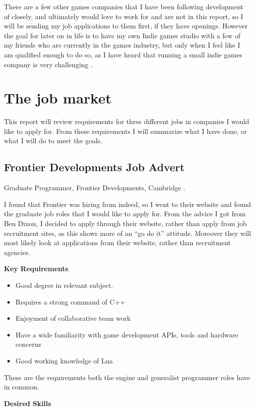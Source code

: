 \documentclass{scrartcl}
\begin{document}
There are a few other games companies that I have been following development of closely, and ultimately would love to work for and are not in this report, so I will be sending my job applications to them first, if they have openings.
However the goal for later on in life is to have my own Indie games studio with a few of my friends who are currently in the games industry, but only when I feel like I am qualified enough to do so, as I have heard that running a small indie games company is very challenging \cite{indieDevelopment}.




\section{The job market}
This report will review requirements for three different jobs in companies I would like to apply for. From these requirements I will summarize what I have done, or what I will do to meet the goals. 


\subsection{Frontier Developments Job Advert}
Graduate Programmer, Frontier Developments, Cambridge  \cite{JobOne}. \par
I found that Frontier was hiring from indeed, so I went to their website and found the graduate job roles that I would like to apply for.
From the advice I got from Ben Dixon, I decided to apply through their website,  rather than apply from job recruitment sites, as this shows more of an ``go do it'' attitude. Moreover they will most likely look at applications from their website, rather than recruitment agencies.


\textbf{Key Requirements}
\begin{itemize}
	\item Good degree in relevant subject.
	\item Requires a strong command of C++
	\item Enjoyment of collaborative team work
	\item Have a wide familiarity with game development APIs, tools and hardware concerns
	\item Good working knowledge of Lua
\end{itemize}
These are the requirements both the engine and generalist programmer roles have in common.

\textbf{Desired Skills}
\end{document}
